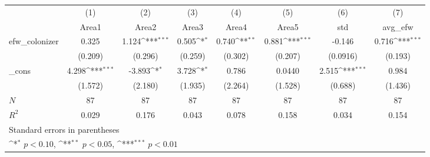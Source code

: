 {
\def\sym#1{\ifmmode^{#1}\else\(^{#1}\)\fi}
\begin{tabular}{l*{7}{c}}
\hline\hline
            &\multicolumn{1}{c}{(1)}&\multicolumn{1}{c}{(2)}&\multicolumn{1}{c}{(3)}&\multicolumn{1}{c}{(4)}&\multicolumn{1}{c}{(5)}&\multicolumn{1}{c}{(6)}&\multicolumn{1}{c}{(7)}\\
            &\multicolumn{1}{c}{Area1}&\multicolumn{1}{c}{Area2}&\multicolumn{1}{c}{Area3}&\multicolumn{1}{c}{Area4}&\multicolumn{1}{c}{Area5}&\multicolumn{1}{c}{std}&\multicolumn{1}{c}{avg\_efw}\\
\hline
efw\_colonizer&       0.325         &       1.124\sym{***}&       0.505\sym{*}  &       0.740\sym{**} &       0.881\sym{***}&      -0.146         &       0.716\sym{***}\\
            &     (0.209)         &     (0.296)         &     (0.259)         &     (0.302)         &     (0.207)         &    (0.0916)         &     (0.193)         \\
[1em]
\_cons      &       4.298\sym{***}&      -3.893\sym{*}  &       3.728\sym{*}  &       0.786         &      0.0440         &       2.515\sym{***}&       0.984         \\
            &     (1.572)         &     (2.180)         &     (1.935)         &     (2.264)         &     (1.528)         &     (0.688)         &     (1.436)         \\
\hline
\(N\)       &          87         &          87         &          87         &          87         &          87         &          87         &          87         \\
\(R^{2}\)   &       0.029         &       0.176         &       0.043         &       0.078         &       0.158         &       0.034         &       0.154         \\
\hline\hline
\multicolumn{8}{l}{\footnotesize Standard errors in parentheses}\\
\multicolumn{8}{l}{\footnotesize \sym{*} \(p<0.10\), \sym{**} \(p<0.05\), \sym{***} \(p<0.01\)}\\
\end{tabular}
}
